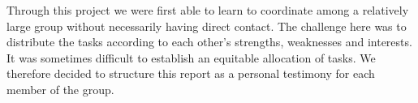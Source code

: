 \documentclass{homework}
\begin{document}
\maketitle



Through this project we were first able to learn to coordinate among a relatively large group without necessarily having direct contact. The challenge here was to distribute the tasks according to each other's strengths, weaknesses and interests. It was sometimes difficult to establish an equitable allocation of tasks. We therefore decided to structure this report as a personal testimony for each member of the group.

\end{document}
